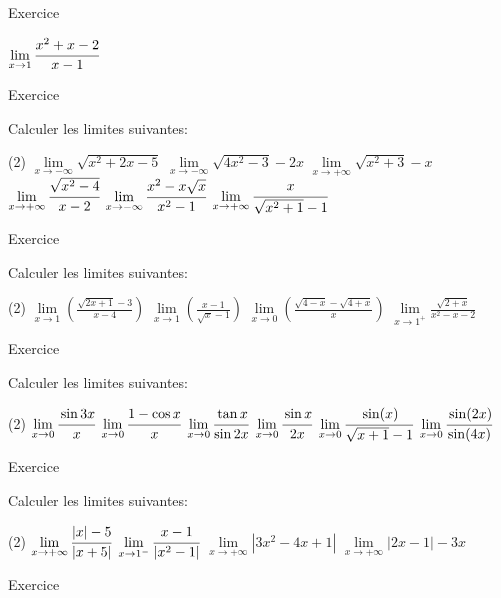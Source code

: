 \documentclass[a4paper,10pt]{article}
\newcounter{numexo}
\newcommand{\numexo}{Exercice \thenumexo \addtocounter{numexo}{1} }
\begin{document}
\begin{multicols}{2}
\begin{mynewbox}{\numexo}
\begin{tasks}
\task $\lim\limits_{x \rightarrow 1} \cfrac{x^{2}+x-2}{x-1}$
\end{tasks}
\end{mynewbox}
\begin{mynewbox}{\numexo}
Calculer les limites suivantes:
\begin{tasks}(2)
\task $\lim\limits_{x \rightarrow-\infty} \sqrt{x^{2}+2 x-5}$
\task $\lim\limits_{x \rightarrow-\infty} \sqrt{4 x^{2}-3}-2 x$
\task $\lim\limits_{x \rightarrow+\infty} \sqrt{x^{2}+3}-x$
\task $\lim\limits_{x \rightarrow+\infty} \cfrac{\sqrt{x^{2}-4}}{x-2}$
\task $\lim\limits_{x \rightarrow-\infty} \cfrac{x^{2}-x \sqrt{x}}{x^{2}-1}$
\task $\lim\limits_{x \rightarrow+\infty} \cfrac{x}{\sqrt{x^{2}+1}-1}$
\end{tasks}
\end{mynewbox}
\begin{mynewbox}{\numexo}
Calculer les limites suivantes:
\begin{tasks}(2)
\task $\lim\limits_{x \rightarrow 1}\left(\frac{\sqrt{2 x+1}-3}{x-4}\right)$
\task $\lim\limits_{x \rightarrow 1}\left(\frac{x-1}{\sqrt{x}-1}\right)$
\task $\lim\limits_{x \rightarrow 0}\left(\frac{\sqrt{4-x}-\sqrt{4+x}}{x}\right)$
\task $\lim\limits_{x \rightarrow 1^{+}} \frac{\sqrt{2+x}}{x^{2}-x-2}$
\end{tasks}
\end{mynewbox}
\begin{mynewbox}{\numexo}
Calculer les limites suivantes:
\begin{tasks}(2)
\task $ \lim\limits_{x \rightarrow 0} \cfrac{\sin 3 x}{x}$
\task $ \lim\limits_{x \rightarrow 0} \cfrac{1-\cos x}{x}$
\task $ \lim\limits_{x \rightarrow 0} \cfrac{\tan x}{\sin 2 x}$
\task $ \lim\limits_{x \rightarrow 0} \cfrac{\sin x}{2 x}$
\task $ \lim\limits_{x \rightarrow 0} \cfrac{\sin (x)}{\sqrt{x+1}-1}$
\task $ \lim\limits_{x \rightarrow 0} \cfrac{\sin (2 x)}{\sin (4 x)}$
\end{tasks}
\end{mynewbox}
\begin{mynewbox}{\numexo}Calculer les limites suivantes:
\begin{tasks}(2)
\task $\lim\limits_{x \rightarrow+\infty} \cfrac{|x|-5}{|x+5|}$
\task $\lim\limits_{x \rightarrow 1^{-}} \cfrac{x-1}{\left|x^{2}-1\right|}$
\task $\lim\limits_{x \rightarrow+\infty}\left|3 x^{2}-4 x+1\right|$
\task $\lim\limits_{x \rightarrow+\infty}|2 x-1|-3 x$
\end{tasks}
\end{mynewbox}
\begin{mynewbox}{\numexo}

\end{mynewbox}
\end{multicols}
\end{document}

